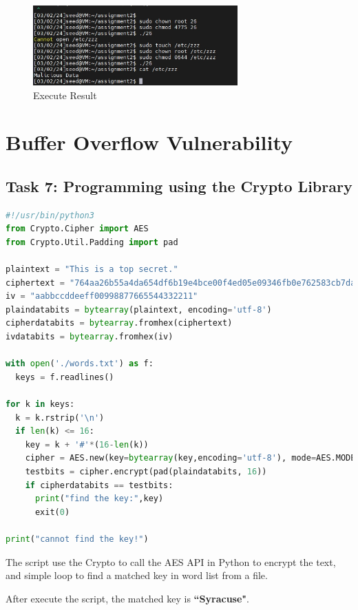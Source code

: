 \documentclass[a4paper,11pt]{article}
\begin{document}
\begin{figure}[h]
    \centering
       \includegraphics[width=0.7\textwidth]{figures/task6/task6.png}
    \caption{Execute Result}\label{fig:task6}
\end{figure}

\section{Buffer Overflow Vulnerability}

\subsection{Task 7: Programming using the Crypto Library}

\begin{lstlisting}[caption={find key script in Python},label={lst:task2.7},language=PYTHON,breaklines=true]
#!/usr/bin/python3
from Crypto.Cipher import AES
from Crypto.Util.Padding import pad

plaintext = "This is a top secret."
ciphertext = "764aa26b55a4da654df6b19e4bce00f4ed05e09346fb0e762583cb7da2ac93a2"
iv = "aabbccddeeff00998877665544332211"
plaindatabits = bytearray(plaintext, encoding='utf-8')
cipherdatabits = bytearray.fromhex(ciphertext)
ivdatabits = bytearray.fromhex(iv)

with open('./words.txt') as f:
  keys = f.readlines()

for k in keys:
  k = k.rstrip('\n')
  if len(k) <= 16:
    key = k + '#'*(16-len(k))
    cipher = AES.new(key=bytearray(key,encoding='utf-8'), mode=AES.MODE_CBC, iv=ivdatabits)
    testbits = cipher.encrypt(pad(plaindatabits, 16))
    if cipherdatabits == testbits:
      print("find the key:",key)
      exit(0)

print("cannot find the key!")
\end{lstlisting} 

The script use the Crypto to call the AES API in Python to encrypt the text, and simple loop to find a matched key in word list from a file.

After execute the script, the matched key is \textbf{``Syracuse"}.
\end{document}
